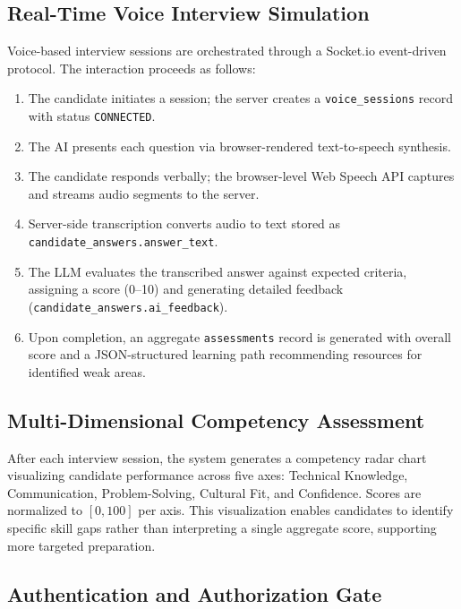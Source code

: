 \documentclass[pdflatex,sn-mathphys-num]{sn-jnl}%
\theoremstyle{thmstyleone}%
\theoremstyle{thmstyletwo}%
\theoremstyle{thmstylethree}%
\begin{document}
\subsection{Real-Time Voice Interview Simulation}\label{subsec4-5}

Voice-based interview sessions are orchestrated through a Socket.io event-driven protocol. The interaction proceeds as follows:

\begin{enumerate}
  \item The candidate initiates a session; the server creates a \texttt{voice\_sessions} record with status \texttt{CONNECTED}.
  \item The AI presents each question via browser-rendered text-to-speech synthesis.
  \item The candidate responds verbally; the browser-level Web Speech API captures and streams audio segments to the server.
  \item Server-side transcription converts audio to text stored as \texttt{candidate\_answers.answer\_text}.
  \item The LLM evaluates the transcribed answer against expected criteria, assigning a score (0--10) and generating detailed feedback (\texttt{candidate\_answers.ai\_feedback}).
  \item Upon completion, an aggregate \texttt{assessments} record is generated with overall score and a JSON-structured learning path recommending resources for identified weak areas.
\end{enumerate}

\subsection{Multi-Dimensional Competency Assessment}\label{subsec4-6}

After each interview session, the system generates a competency radar chart visualizing candidate performance across five axes: Technical Knowledge, Communication, Problem-Solving, Cultural Fit, and Confidence. Scores are normalized to $[0, 100]$ per axis. This visualization enables candidates to identify specific skill gaps rather than interpreting a single aggregate score, supporting more targeted preparation.

\subsection{Authentication and Authorization Gate}\label{subsec4-7}
\end{document}
